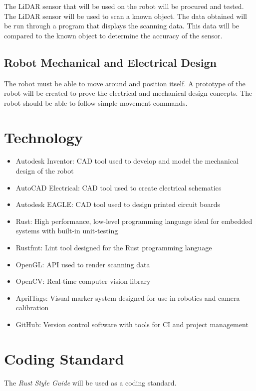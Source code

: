 \documentclass[titlepage]{article}
\begin{document}
The LiDAR sensor that will be used on the robot will be procured and tested. The LiDAR sensor will be used to scan a known object. The data obtained will be run through a program that displays the scanning data. This data will be compared to the known object to determine the accuracy of the sensor.

\subsection{Robot Mechanical and Electrical Design}

The robot must be able to move around and position itself. A prototype of the robot will be created to prove the electrical and mechanical design concepts. The robot should be able to follow simple movement commands.

\section{Technology}

\begin{itemize}
\item Autodesk Inventor: CAD tool used to develop and model the mechanical design of the robot
\item AutoCAD Electrical: CAD tool used to create electrical schematics
\item Autodesk EAGLE: CAD tool used to design printed circuit boards
\item Rust: High performance, low-level programming language ideal for embedded systems with built-in unit-testing
\item Rustfmt: Lint tool designed for the Rust programming language
\item OpenGL: API used to render scanning data
\item OpenCV: Real-time computer vision library 
\item AprilTags: Visual marker system designed for use in robotics and camera calibration
\item GitHub: Version control software with tools for CI and project management

\end{itemize}

\section{Coding Standard}

The \textit{Rust Style Guide} will be used as a coding standard.
\end{document}

